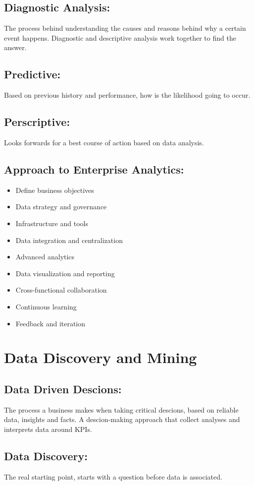 \documentclass[a5paper]{article}
\begin{document}
	\subsection{Diagnostic Analysis:}
	The process behind understanding the causes and reasons behind why a certain event happens. Diagnostic and descriptive analysis work together to find the answer.
	\subsection{Predictive:}
	Based on previous history and performance, how is the likelihood going to occur.
	\subsection{Perscriptive:}
	Looks forwards for a best course of action based on data analysis.
	\subsection{Approach to Enterprise Analytics:}
	\begin{itemize}
		\item Define business objectives
		\item Data strategy and governance
		\item Infrastructure and tools
		\item Data integration and centralization
		\item Advanced analytics
		\item Data visualization and reporting
		\item Cross-functional collaboration
		\item Continuous learning
		\item Feedback and iteration
	\end{itemize}

	\section{Data Discovery and Mining}
	\subsection{Data Driven Descions:}
	The process a business makes when taking critical descions, based on reliable data, insights and facts. A descion-making approach that collect analyses and interprets data around KPIs.
	\subsection{Data Discovery:}
	The real starting point, starts with a question before data is associated.
\end{document}
